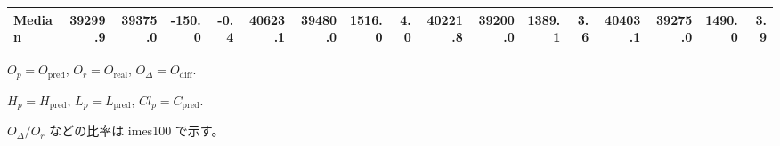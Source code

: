 \begin{threeparttable}
{\begin{tabular}{lrrrrrrrrrrrrrrrr}
 Median & 39299.9 & 39375.0 &     -150.0 &           -0.4 & 40623.1 & 39480.0 &     1516.0 &            4.0 & 40221.8 & 39200.0 &     1389.1 &            3.6 & 40403.1 & 39275.0 &      1490.0 &              3.9 \\
\bottomrule
\end{tabular}
}
\begin{tablenotes}\footnotesize
\item $O_p=O_{\text{pred}}$, $O_r=O_{\text{real}}$, $O_\Delta=O_{\text{diff}}$.
\item $H_p=H_{\text{pred}}$, $L_p=L_{\text{pred}}$, $Cl_p=C_{\text{pred}}$.
\item $O_\Delta/O_r$ などの比率は 	imes100 で示す。
\end{tablenotes}
\end{threeparttable}
\endgroup
